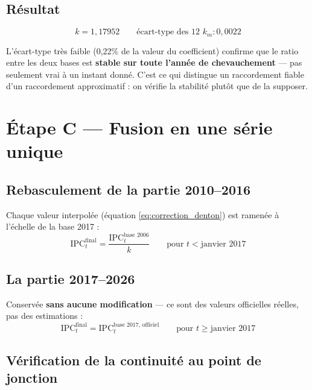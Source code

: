 \documentclass[11pt,a4paper]{article}
\begin{document}
\subsection{Résultat}

\begin{fichebox}
$$k = 1{,}17952 \qquad \text{écart-type des 12 } k_m : 0{,}0022$$
\end{fichebox}

\begin{noteboxbleu}
L'écart-type très faible (0,22\% de la valeur du coefficient) confirme que le ratio entre les deux bases est \textbf{stable sur toute l'année de chevauchement} --- pas seulement vrai à un instant donné. C'est ce qui distingue un raccordement fiable d'un raccordement approximatif : on vérifie la stabilité plutôt que de la supposer.
\end{noteboxbleu}

\section{Étape C --- Fusion en une série unique}

\subsection{Rebasculement de la partie 2010--2016}

Chaque valeur interpolée (équation \ref{eq:correction_denton}) est ramenée à l'échelle de la base 2017 :
\begin{equation}
\text{IPC}_{t}^{\text{final}} = \frac{\text{IPC}_{t}^{\text{base 2006}}}{k} \qquad \text{pour } t < \text{janvier 2017}
\end{equation}

\subsection{La partie 2017--2026}

Conservée \textbf{sans aucune modification} --- ce sont des valeurs officielles réelles, pas des estimations :
\begin{equation}
\text{IPC}_{t}^{\text{final}} = \text{IPC}_{t}^{\text{base 2017, officiel}} \qquad \text{pour } t \geq \text{janvier 2017}
\end{equation}

\subsection{Vérification de la continuité au point de jonction}
\end{document}
